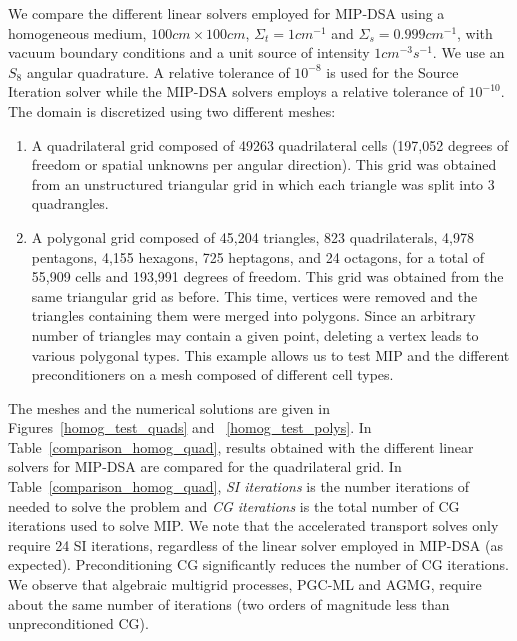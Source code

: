 \documentclass[preprint,10pt]{elsarticle}
\renewcommand{\(}{\left(}
\renewcommand{\)}{\right)}
\renewcommand{\[}{\left[}
\renewcommand{\]}{\right]}
\begin{document}
We compare the different linear solvers employed for MIP-DSA using a homogeneous medium, $100cm
\times 100cm$, $\Sigma_t = 1cm^{-1}$ and $\Sigma_s = 0.999cm^{-1}$, with
vacuum boundary conditions and a unit source of intensity $1cm^{-3}s^{-1}$. We
use an $S_8$ angular quadrature. A relative tolerance of  $10^{-8}$ is used for the Source Iteration solver
while the MIP-DSA solvers employs a relative tolerance of $10^{-10}$. 
The domain is discretized using two different meshes:
\begin{enumerate}
  \item A quadrilateral grid composed of 49263 quadrilateral
    cells (197,052 degrees of freedom or spatial unknowns per angular direction). This grid was 
		obtained from an unstructured triangular grid in which each triangle was split into 3 quadrangles.
  \item A polygonal grid composed of 45,204 triangles, 823
    quadrilaterals, 4,978 pentagons, 4,155 hexagons, 725 heptagons, and 24
    octagons, for a total of 55,909 cells and 193,991 degrees of freedom. This grid was obtained 
		from the same triangular grid as before. This time, vertices were removed and the triangles 
		containing them were merged into polygons. Since an arbitrary number of triangles may contain 
		a given point, deleting a vertex leads to various polygonal types. This
    example allows us to test MIP and the different preconditioners on a
    mesh composed of different cell types.
\end{enumerate}
%
The meshes and the numerical solutions are given in Figures~\ref {homog_test_quads} and~ \ref {homog_test_polys}.
In Table~\ref {comparison_homog_quad}, results obtained with the different linear solvers for MIP-DSA 
are compared for the quadrilateral grid.
In Table~\ref {comparison_homog_quad}, {\it SI iterations} is the number iterations of 
needed to solve the problem 
and {\it CG iterations} is the total number of CG iterations used to solve MIP.
We note that the accelerated transport solves only require 24 SI iterations, regardless of the linear solver
employed in MIP-DSA (as expected). Preconditioning CG significantly reduces the number of CG iterations.
%
We observe that algebraic multigrid processes, PGC-ML and AGMG, require 
about the same number of iterations (two orders of magnitude less than unpreconditioned CG). 
\end{document}

